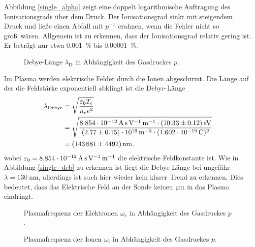 Abbildung \vref{single_alpha} zeigt eine doppelt logarithmische Auftragung des Ionisationsgrads \"uber dem Druck.
Der Ionisationsgrad sinkt mit steigendem Druck und lie\ss e einen Abfall mit $p^{-x}$ erahnen, wenn die Fehler nicht so gro\ss\ w\"aren.
Allgemein ist zu erkennen, dass der Ionisationsgrad relativ gering ist.
Er betr\"agt nur etwa \SI{0.001}{\percent} bis \SI{0.00001}{\percent}.

\begin{figure}[htbp]
    \centering
    
    \caption{
        Debye-L\"ange $\lambda_\text{D}$ in Abh\"angigkeit des Gasdruckes $p$.
    }
    \label{single_deb}
\end{figure}

Im Plasma werden elektrische Felder durch die Ionen abgeschirmt.
Die L\"ange auf der die Feldst\"arke exponentiell abklingt ist die Debye-L\"ange
\begin{align}
\lambda_\text{Debye}
    &=\sqrt{\frac{\varepsilon_0 T_e}{n_e e^2}}
    \label{sdeb}\\
    &=\sqrt{\frac{\sieO \cdot\siATea}{\siAnea\cdot(\sie)^2}} \nonumber\\
    &=\siAdeba\nonumber,
\end{align}
wobei $\varepsilon_0=\SI{8.854e-12}{\ampere\second\per\volt\per\metre}$ die elektrische Feldkonstante ist.
Wie in Abbildung \vref{single_deb} zu erkennen ist liegt die Debye-L\"ange bei ungef\"ahr $\lambda =\SI{130}{\nano\metre}$, allerdings ist auch hier wieder kein klarer Trend zu erkennen.
Dies bedeutet, dass das Elektrische Feld an der Sonde keinen \si{\micro\metre} in das Plasma eindringt.

\begin{figure}[htbp]
\centering

\caption{
    Plasmafrequenz der Elektronen $\omega_e$ in Abh\"angigkeit des Gasdruckes $p$.
}
\label{single_wpe}
\end{figure}

\begin{figure}[htbp]
\centering

\caption{
    Plasmafrequenz der Ionen $\omega_i$ in Abh\"angigkeit des Gasdruckes $p$.
}
\label{single_wpi}
\end{figure}

